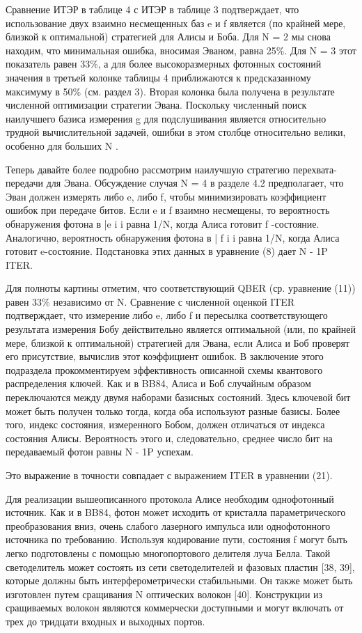 Сравнение ИТЭР в таблице 4 с ИТЭР в таблице 3 подтверждает, что использование двух взаимно несмещенных баз e и f является (по крайней мере, близкой к оптимальной) стратегией для Алисы и Боба. Для N = 2 мы снова находим, что минимальная ошибка, вносимая Эваном, равна 25\%. Для N = 3 этот показатель равен 33\%, а для более высокоразмерных фотонных состояний значения в третьей колонке таблицы 4 приближаются к предсказанному максимуму в 50\% (см. раздел 3). Вторая колонка была получена в результате численной оптимизации стратегии Эвана. Поскольку численный поиск наилучшего базиса измерения g для подслушивания является относительно трудной вычислительной задачей, ошибки в этом столбце относительно велики, особенно для больших N .


Теперь давайте более подробно рассмотрим наилучшую стратегию перехвата-передачи для Эвана. Обсуждение случая N = 4 в разделе 4.2 предполагает, что Эван должен измерять либо e, либо f, чтобы минимизировать коэффициент ошибок при передаче битов. Если e и f взаимно несмещены, то вероятность обнаружения фотона в |e i i равна 1/N, когда Алиса готовит f -состояние. Аналогично, вероятность обнаружения фотона в | f i i равна 1/N, когда Алиса готовит e-состояние. Подстановка этих данных в уравнение (8) дает N - 1P ITER.

Для полноты картины отметим, что соответствующий QBER (ср. уравнение (11)) равен 33\% независимо от N. Сравнение с численной оценкой ITER подтверждает, что измерение либо e, либо f и пересылка соответствующего результата измерения Бобу действительно является оптимальной (или, по крайней мере, близкой к оптимальной) стратегией для Эвана, если Алиса и Боб проверят его присутствие, вычислив этот коэффициент ошибок.
В заключение этого подраздела прокомментируем эффективность описанной схемы квантового распределения ключей. Как и в BB84, Алиса и Боб случайным образом переключаются между двумя наборами базисных состояний. Здесь ключевой бит может быть получен только тогда, когда оба используют разные базисы. Более того, индекс состояния, измеренного Бобом, должен отличаться от индекса состояния Алисы. Вероятность этого и, следовательно, среднее число бит на передаваемый фотон равны N - 1P успехам.

Это выражение в точности совпадает с выражением ITER в уравнении (21).

Для реализации вышеописанного протокола Алисе необходим однофотонный источник. Как и в BB84, фотон может исходить от кристалла параметрического преобразования вниз, очень слабого лазерного импульса или однофотонного источника по требованию. Используя кодирование пути, состояния f могут быть легко подготовлены с помощью многопортового делителя луча Белла. Такой светоделитель может состоять из сети светоделителей и фазовых пластин [38, 39], которые должны быть интерферометрически стабильными. Он также может быть изготовлен путем сращивания N оптических волокон [40]. Конструкции из сращиваемых волокон являются коммерчески доступными и могут включать от трех до тридцати входных и выходных портов.

